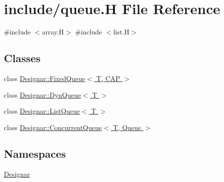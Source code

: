 \hypertarget{queue_8_h}{}\section{include/queue.H File Reference}
\label{queue_8_h}
{\ttfamily \#include $<$array.\+H$>$}\newline
{\ttfamily \#include $<$list.\+H$>$}\newline
\subsection*{Classes}
\begin{DoxyCompactItemize}
\item 
class \hyperlink{class_designar_1_1_fixed_queue}{Designar\+::\+Fixed\+Queue$<$ T, C\+A\+P $>$}
\item 
class \hyperlink{class_designar_1_1_dyn_queue}{Designar\+::\+Dyn\+Queue$<$ T $>$}
\item 
class \hyperlink{class_designar_1_1_list_queue}{Designar\+::\+List\+Queue$<$ T $>$}
\item 
class \hyperlink{class_designar_1_1_concurrent_queue}{Designar\+::\+Concurrent\+Queue$<$ T, Queue $>$}
\end{DoxyCompactItemize}
\subsection*{Namespaces}
\begin{DoxyCompactItemize}
\item 
 \hyperlink{namespace_designar}{Designar}
\end{DoxyCompactItemize}
